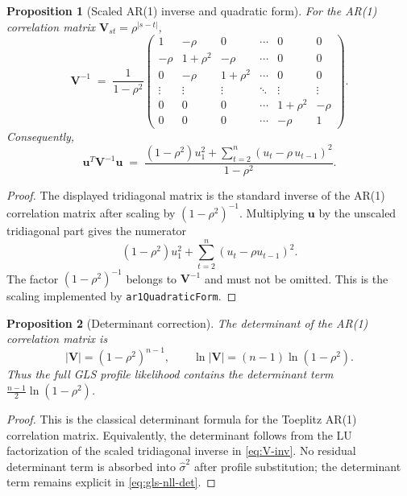 \documentclass[11pt]{article}
\newtheorem{proposition}{Proposition}
\begin{document}
\begin{proposition}[Scaled AR(1) inverse and quadratic form]\label{prop:quadratic-form}
For the AR(1) correlation matrix $\bm{V}_{st}=\rho^{|s-t|}$,
\begin{equation}\label{eq:V-inv}
\bm{V}^{-1}\;=\;\frac{1}{1-\rho^2}\begin{pmatrix}
1 & -\rho & 0 & \cdots & 0 & 0 \\
-\rho & 1+\rho^2 & -\rho & \cdots & 0 & 0 \\
0 & -\rho & 1+\rho^2 & \cdots & 0 & 0 \\
\vdots & \vdots & \vdots & \ddots & \vdots & \vdots \\
0 & 0 & 0 & \cdots & 1+\rho^2 & -\rho \\
0 & 0 & 0 & \cdots & -\rho & 1
\end{pmatrix}.
\end{equation}
Consequently,
\begin{equation}\label{eq:pw-quadratic}
\bm{u}^T\bm{V}^{-1}\bm{u}\;=\;\frac{(1-\rho^2)u_1^2+\sum_{t=2}^n(u_t-\rho\,u_{t-1})^2}{1-\rho^2}.
\end{equation}
\end{proposition}

\begin{proof}
The displayed tridiagonal matrix is the standard inverse of the AR(1) correlation matrix after scaling by $(1-\rho^2)^{-1}$. Multiplying $\bm{u}$ by the unscaled tridiagonal part gives the numerator
\[
(1-\rho^2)u_1^2+\sum_{t=2}^n(u_t-\rho u_{t-1})^2.
\]
The factor $(1-\rho^2)^{-1}$ belongs to $\bm{V}^{-1}$ and must not be omitted. This is the scaling implemented by \texttt{ar1QuadraticForm}.
\end{proof}

\begin{proposition}[Determinant correction]\label{prop:determinant}
The determinant of the AR(1) correlation matrix is
\begin{equation}\label{eq:log-det}
|\bm{V}|=(1-\rho^2)^{n-1},\qquad
\ln|\bm{V}|=(n-1)\ln(1-\rho^2).
\end{equation}
Thus the full GLS profile likelihood contains the determinant term $\frac{n-1}{2}\ln(1-\rho^2)$.
\end{proposition}

\begin{proof}
This is the classical determinant formula for the Toeplitz AR(1) correlation matrix. Equivalently, the determinant follows from the LU factorization of the scaled tridiagonal inverse in \eqref{eq:V-inv}. No residual determinant term is absorbed into $\hat{\sigma}^2$ after profile substitution; the determinant term remains explicit in \eqref{eq:gls-nll-det}.
\end{proof}
\end{document}
